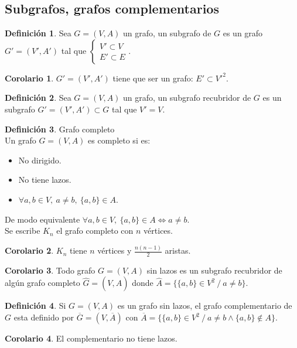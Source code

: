 \documentclass[10pt]{article}
\theoremstyle{definition}
\newtheorem{definition}{Definición}[section]
\newtheorem{corollary}{Corolario}[theorem]
\begin{document}
    \subsection{Subgrafos, grafos complementarios}
    \begin{definition}
        Sea $G=(V,A)$ un grafo, un subgrafo de $G$ es un grafo $G'=(V',A')$ tal que $\begin{cases}V'\subset V\\E'\subset E\end{cases}$.
    \end{definition}
    \begin{corollary}
        $G'=(V',A')$ tiene que ser un grafo: $E'\subset V'^2$.
    \end{corollary}
    \begin{definition}
        Sea $G=(V,A)$ un grafo, un subgrafo recubridor de $G$ es un subgrafo $G'=(V',A')\subset G$ tal que $V'=V$.
    \end{definition}
    \begin{definition}{Grafo completo}
        \\Un grafo $G=(V,A)$ es completo si es:
        \begin{itemize}
            \item No dirigido.
            \item No tiene lazos.
            \item $\forall a,b\in V,\ a\neq b,\ \{a,b\}\in A$.
        \end{itemize}
        De modo equivalente $\forall a,b\in V,\ \{a,b\}\in A\Leftrightarrow a\neq b$.\\
        Se escribe $K_n$ el grafo completo con $n$ vértices.
    \end{definition}
    \begin{corollary}
        $K_n$ tiene $n$ vértices y $\frac{n(n-1)}{2}$ aristas.
    \end{corollary}
    \begin{corollary}
        Todo grafo $G=(V,A)$ sin lazos es un subgrafo recubridor de algún grafo completo $\hat{G}=(V,\hat{A})$ donde $\hat{A}=\{\{a,b\}\in V^2\ /\ a\neq b\}$.
    \end{corollary}
    \begin{definition}
        Si $G=(V,A)$ es un grafo sin lazos, el grafo complementario de $G$ esta definido por $\overline{G}=(V,\overline{A})$ con $\overline{A}=\{\{a,b\}\in V^2\ /\ a\neq b\wedge \{a,b\}\notin A\}$.
    \end{definition}
    \begin{corollary}
        El complementario no tiene lazos.
    \end{corollary}
\end{document}

